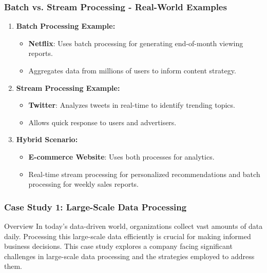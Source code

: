 \documentclass{beamer}
\begin{document}
\begin{frame}[fragile]
    \frametitle{Batch vs. Stream Processing - Real-World Examples}
    
    \begin{enumerate}
        \item \textbf{Batch Processing Example:}
            \begin{itemize}
                \item \textbf{Netflix}: Uses batch processing for generating end-of-month viewing reports.
                \item Aggregates data from millions of users to inform content strategy.
            \end{itemize}
        
        \item \textbf{Stream Processing Example:}
            \begin{itemize}
                \item \textbf{Twitter}: Analyzes tweets in real-time to identify trending topics.
                \item Allows quick response to users and advertisers.
            \end{itemize}
        
        \item \textbf{Hybrid Scenario:}
            \begin{itemize}
                \item \textbf{E-commerce Website}: Uses both processes for analytics.
                \item Real-time stream processing for personalized recommendations and batch processing for weekly sales reports.
            \end{itemize}
    \end{enumerate}
\end{frame}

\begin{frame}[fragile]
    \frametitle{Case Study 1: Large-Scale Data Processing}
    \begin{block}{Overview}
        In today’s data-driven world, organizations collect vast amounts of data daily. Processing this large-scale data efficiently is crucial for making informed business decisions. This case study explores a company facing significant challenges in large-scale data processing and the strategies employed to address them.
    \end{block}
\end{frame}
\end{document}
